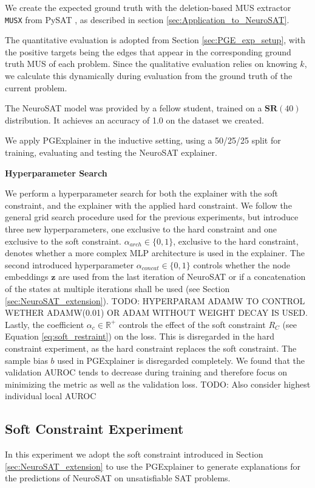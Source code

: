 We create the expected ground truth with the deletion-based MUS extractor \verb|MUSX| from PySAT \cite{imms-sat18}, as described in section \ref{sec:Application_to_NeuroSAT}.

The quantitative evaluation is adopted from Section \ref{sec:PGE_exp_setup}, with the positive targets being the edges that appear in the corresponding ground truth MUS of each problem. Since the qualitative evaluation relies on knowing $k$, we calculate this dynamically during evaluation from the ground truth of the current problem.

The NeuroSAT model was provided by a fellow student, trained on a $\textbf{SR}(40)$ distribution. It achieves an accuracy of 1.0 on the dataset we created.

We apply PGExplainer in the inductive setting, using a 50/25/25 split for training, evaluating and testing the NeuroSAT explainer. \bigskip

\textbf{Hyperparameter Search}\par
We perform a hyperparameter search for both the explainer with the soft constraint, and the explainer with the applied hard constraint. We follow the general grid search procedure used for the previous experiments, but introduce three new hyperparameters, one exclusive to the hard constraint and one exclusive to the soft constraint. $\alpha_{arch} \in \{0,1\}$, exclusive to the hard constraint, denotes whether a more complex MLP architecture is used in the explainer. The second introduced hyperparameter $\alpha_{concat} \in \{0,1\}$ controls whether the node embeddings $\mathbf{z}$ are used from the last iteration of NeuroSAT or if a concatenation of the states at multiple iterations shall be used (see Section \ref{sec:NeuroSAT_extension}). TODO: HYPERPARAM ADAMW TO CONTROL WETHER ADAMW(0.01) OR ADAM WITHOUT WEIGHT DECAY IS USED. Lastly, the coefficient $\alpha_{c} \in \mathbb{R}^+$ controls the effect of the soft constraint $R_C$ (see Equation \ref{eq:soft_restraint}) on the loss. This is disregarded in the hard constraint experiment, as the hard constraint replaces the soft constraint. The sample bias $b$ used in PGExplainer is disregarded completely. We found that the validation AUROC tends to decrease during training and therefore focus on minimizing the metric as well as the validation loss. TODO: Also consider highest individual local AUROC


\subsection{Soft Constraint Experiment}
In this experiment we adopt the soft constraint introduced in Section \ref{sec:NeuroSAT_extension} to use the PGExplainer to generate explanations for the predictions of NeuroSAT on unsatisfiable SAT problems. \bigskip


